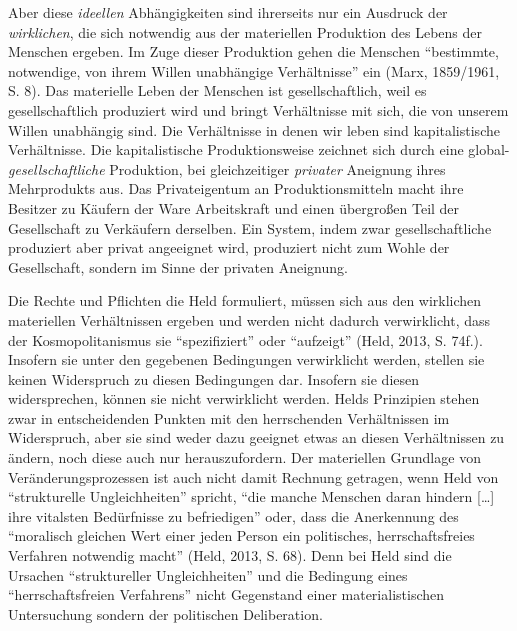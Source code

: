 \documentclass[ngerman,12pt, titlepage, smallheadings, nomath]{scrartcl}
\begin{document}
Aber diese \emph{ideellen} Abhängigkeiten sind ihrerseits nur ein
Ausdruck der \emph{wirklichen}, die sich notwendig aus der materiellen
Produktion des Lebens der Menschen ergeben. Im Zuge dieser Produktion
gehen die Menschen \enquote{bestimmte, notwendige, von ihrem Willen
unabhängige Verhältnisse} ein (Marx, 1859/1961, S. 8). Das materielle
Leben der Menschen ist gesellschaftlich, weil es gesellschaftlich
produziert wird und bringt Verhältnisse mit sich, die von unserem Willen
unabhängig sind. Die Verhältnisse in denen wir leben sind
kapitalistische Verhältnisse. Die kapitalistische Produktionsweise
zeichnet sich durch eine global-\emph{gesellschaftliche} Produktion, bei
gleichzeitiger \emph{privater} Aneignung ihres Mehrprodukts aus. Das
Privateigentum an Produktionsmitteln macht ihre Besitzer zu Käufern der
Ware Arbeitskraft und einen übergroßen Teil der Gesellschaft zu
Verkäufern derselben. Ein System, indem zwar gesellschaftliche
produziert aber privat angeeignet wird, produziert nicht zum Wohle der
Gesellschaft, sondern im Sinne der privaten Aneignung.

Die Rechte und Pflichten die Held formuliert, müssen sich aus den
wirklichen materiellen Verhältnissen ergeben und werden nicht dadurch
verwirklicht, dass der Kosmopolitanismus sie \enquote{spezifiziert} oder
\enquote{aufzeigt} (Held, 2013, S. 74f.). Insofern sie unter den
gegebenen Bedingungen verwirklicht werden, stellen sie keinen
Widerspruch zu diesen Bedingungen dar. Insofern sie diesen
widersprechen, können sie nicht verwirklicht werden. Helds Prinzipien
stehen zwar in entscheidenden Punkten mit den herrschenden Verhältnissen
im Widerspruch, aber sie sind weder dazu geeignet etwas an diesen
Verhältnissen zu ändern, noch diese auch nur herauszufordern. Der
materiellen Grundlage von Veränderungsprozessen ist auch nicht damit
Rechnung getragen, wenn Held von \enquote{strukturelle Ungleichheiten}
spricht, \enquote{die manche Menschen daran hindern {[}\ldots{}{]} ihre
vitalsten Bedürfnisse zu befriedigen} oder, dass die Anerkennung des
\enquote{moralisch gleichen Wert einer jeden Person ein politisches,
herrschaftsfreies Verfahren notwendig macht} (Held, 2013, S. 68). Denn
bei Held sind die Ursachen \enquote{struktureller Ungleichheiten} und
die Bedingung eines \enquote{herrschaftsfreien Verfahrens} nicht
Gegenstand einer materialistischen Untersuchung sondern der politischen
Deliberation.
\end{document}
